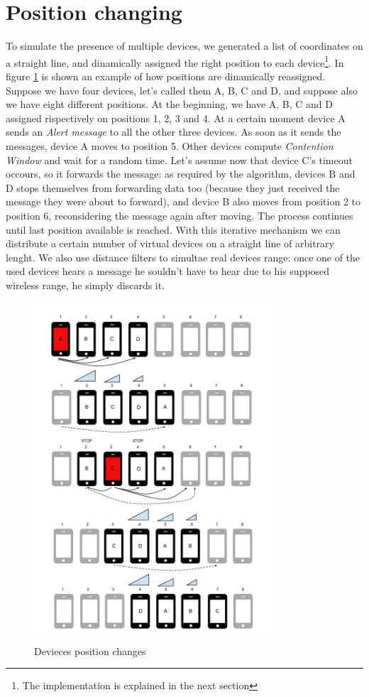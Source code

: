 \section{Position changing}
\label{sec:position_change}

To simulate the presence of multiple devices, we generated a list of coordinates on a straight line, and dinamically assigned the right position to each device\footnote{The implementation is explained in the next section}. In figure \ref{fig:positions} is shown an example of how positions are dinamically reassigned. Suppose we have four devices, let's called them A, B, C and D, and suppose also we have eight different positions. At the beginning, we have A, B, C and D assigned rispectively on positions 1, 2, 3 and 4. At a certain moment device A sends an \emph{Alert message} to all the other three devices. As soon as it sends the messages, device A moves to position 5. Other devices compute \textit{Contention Window} and wait for a random time. Let's assume now that device C's timeout occours, so it forwards the message: as required by the algorithm, devices B and D stops themselves from forwarding data too (because they just received the message they were about to forward), and device B also moves from position 2 to position 6, reconsidering the message again after moving. The process continues until last position available is reached.
With this iterative mechanism we can distribute a certain number of virtual devices on a straight line of arbitrary lenght. 
We also use distance filters to simultae real devices range: once one of the used devices hears a message he souldn't have to hear due to his supposed wireless range, he simply discards it.

\begin{figure}[htbp]
\centering
\includegraphics[width=3.5in]{imgs/Positions_1.pdf}
\caption{Devieces position changes}
\label{fig:positions}
\end{figure}
